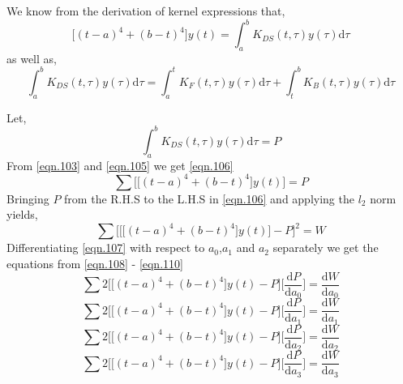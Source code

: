 \documentclass{article}
\begin{document}
We know from the derivation of kernel expressions that, 
\begin{equation}\label{eqn.103}
\bigg[(t-a)^4+(b-t)^4\bigg]y(t) = \int_{a}^{b} K_{DS}(t,\tau)y(\tau)\mathrm{d}\tau
\end{equation}
as well as,
\begin{equation}\label{eqn.104}
\int_{a}^{b} K_{DS}(t,\tau)y(\tau)\mathrm{d}\tau = \int_{a}^{t}K_{F}(t,\tau)y(\tau)\mathrm{d}\tau + \int_{t}^{b}K_{B}(t,\tau)y(\tau)\mathrm{d}\tau 
\end{equation}
\par Let,
\begin{equation}\label{eqn.105}
\int_{a}^{b} K_{DS}(t,\tau)y(\tau)\mathrm{d}\tau = P
\end{equation}
From \eqref{eqn.103} and \eqref{eqn.105} we get \eqref{eqn.106}
\begin{equation}\label{eqn.106}
\sum\bigg[\big[(t-a)^4 + (b-t)^4\big]y(t)\bigg] = P
\end{equation}
Bringing $P$ from the R.H.S to the L.H.S in \eqref{eqn.106} and applying the $l_2$ norm yields,
\begin{equation}\label{eqn.107}
\sum\bigg[\bigg[\big[(t-a)^4 + (b-t)^4\big]y(t)\bigg] - P\bigg]^2 = W 
\end{equation}
Differentiating \eqref{eqn.107} with respect to $a_{0}$,$a_{1}$ and $a_{2}$ separately we get the equations from \eqref{eqn.108} - \eqref{eqn.110}
\begin{equation}\label{eqn.108}
\sum 2\bigg[\big[(t-a)^4 + (b-t)^4\big]y(t) - P\bigg] \bigg[\frac{\mathrm{d}P}{\mathrm{d}a_{0}}\bigg] = \frac{\mathrm{d}W}{\mathrm{d}a_{0}}  
\end{equation}
\begin{equation}\label{eqn.109}
\sum 2\bigg[\big[(t-a)^4 + (b-t)^4\big]y(t) - P\bigg] \bigg[\frac{\mathrm{d}P}{\mathrm{d}a_{1}}\bigg] = \frac{\mathrm{d}W}{\mathrm{d}a_{1}}  
\end{equation}
\begin{equation}\label{eqn.110}
\sum 2\bigg[\big[(t-a)^4 + (b-t)^4\big]y(t) - P\bigg] \bigg[\frac{\mathrm{d}P}{\mathrm{d}a_{2}}\bigg] = \frac{\mathrm{d}W}{\mathrm{d}a_{2}} 
\end{equation}
\begin{equation}\label{eqn.110.5}
\sum 2\bigg[\big[(t-a)^4 + (b-t)^4\big]y(t) - P\bigg] \bigg[\frac{\mathrm{d}P}{\mathrm{d}a_{3}}\bigg] = \frac{\mathrm{d}W}{\mathrm{d}a_{3}} 
\end{equation}
\end{document}
